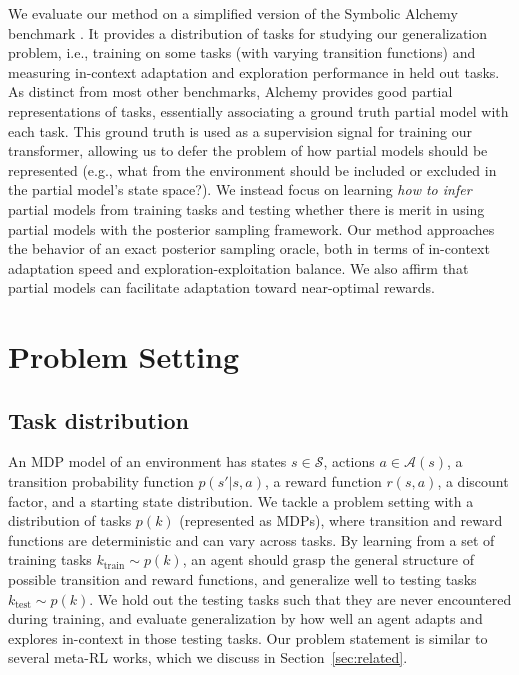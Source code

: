 \documentclass[sigconf]{aamas}
\begin{document}
We evaluate our method on a simplified version of the Symbolic Alchemy benchmark \cite{wangAlchemyBenchmarkAnalysis2021}. It provides a distribution of tasks for studying our generalization problem, i.e., training on some tasks (with varying transition functions) and measuring in-context adaptation and exploration performance in held out tasks. As distinct from most other benchmarks, Alchemy provides good partial representations of tasks, essentially associating a ground truth partial model with each task. This ground truth is used as a supervision signal for training our transformer, allowing us to defer the problem of how partial models should be represented (e.g., what from the environment should be included or excluded in the partial model's state space?). We instead focus on learning \textit{how to infer} partial models from training tasks and testing whether there is merit in using partial models with the posterior sampling framework. Our method approaches the behavior of an exact posterior sampling oracle, both in terms of in-context adaptation speed and exploration-exploitation balance. We also affirm that partial models can facilitate adaptation toward near-optimal rewards.

\section{Problem Setting}\label{sec:problem-setting}
\subsection{Task distribution}
An MDP model of an environment has states $s \in \mathscr{S}$, actions $a \in \mathscr{A}(s)$, a transition probability function $p(s'|s,a)$, a reward function $r(s, a)$, a discount factor, and a starting state distribution. We tackle a problem setting with a distribution of tasks $p(k)$ (represented as MDPs), where transition and reward functions are deterministic and can vary across tasks. By learning from a set of training tasks $k_{\text{train}} \sim p(k)$, an agent should grasp the general structure of possible transition and reward functions, and generalize well to testing tasks $k_{\text{test}} \sim p(k)$. We hold out the testing tasks such that they are never encountered during training, and evaluate generalization by how well an agent adapts and explores in-context in those testing tasks. Our problem statement is similar to several meta-RL works, which we discuss in Section~\ref{sec:related}.
\end{document}
